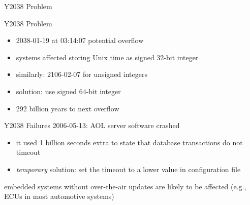 \begin{frame}{Y2038 Problem }
	\begin{fancycolumns}
		\begin{definition}{Y2038 Problem}
			\begin{itemize}
				\item 2038-01-19 at 03:14:07 potential overflow
				\item systems affected storing Unix time as signed 32-bit integer
				\item similarly: 2106-02-07 for unsigned integers
				\item solution: use signed 64-bit integer
				\item 292 billion years to next overflow
			\end{itemize}
		\end{definition}
		\centering{}
	\nextcolumn
		\begin{example}{Y2038 Failures}
			2006-05-13: AOL server software crashed
			\begin{itemize}
				\item it used 1 billion seconds extra to state that database transactions do not timeout
				\item \emph{temporary} solution: set the timeout to a lower value in configuration file
			\end{itemize}
			embedded systems without over-the-air updates are likely to be affected (e.g., ECUs in most automotive systems)
		\end{example}
	\end{fancycolumns}
\end{frame}

